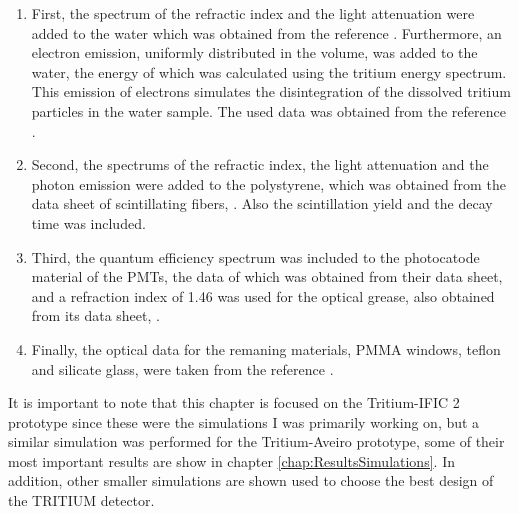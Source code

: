 \begin{enumerate}

\item{} First, the spectrum of the refractic index and the light attenuation were added to the water which was obtained from the reference \cite{WaterPropertiesSimulation}. Furthermore, an electron emission, uniformly distributed in the volume, was added to the water, the energy of which was calculated using the tritium energy spectrum. This emission of electrons simulates the disintegration of the dissolved tritium particles in the water sample. The used data was obtained from the reference \cite{TritiumEmissionSpectrum}.

\item{} Second, the spectrums of the refractic index, the light attenuation and the photon emission were added to the polystyrene, which was obtained from the data sheet of scintillating fibers, \cite{DataSheetBCF12Fiber}.  Also the scintillation yield and the decay time was included. 

\item{} Third, the quantum efficiency spectrum was included to the photocatode material of the PMTs, the data of which was obtained from their data sheet, \cite{DataSheetPMTs} and a refraction index of 1.46 was used for the optical grease, also obtained from its data sheet, \cite{OpticalGrease}.

\item{} Finally, the optical data for the remaning materials, PMMA windows, teflon and silicate glass, were taken from the reference \cite{NEMODataSimulation}.

\end{enumerate} 

It is important to note that this chapter is focused on the Tritium-IFIC 2 prototype since these were the simulations I was primarily working on, but a similar simulation was performed for the Tritium-Aveiro prototype, some of their most important results are show in chapter \ref{chap:ResultsSimulations}. In addition, other smaller simulations are shown used to choose the best design of the TRITIUM detector.